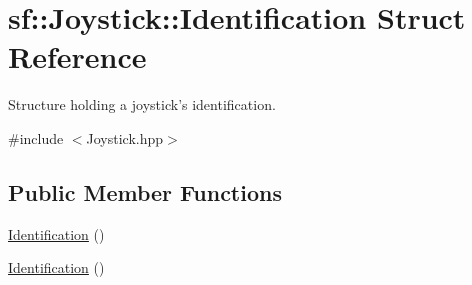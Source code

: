 \hypertarget{structsf_1_1_joystick_1_1_identification}{\section{sf\-:\-:Joystick\-:\-:Identification Struct Reference}
\label{structsf_1_1_joystick_1_1_identification}
}


Structure holding a joystick's identification.  




{\ttfamily \#include $<$Joystick.\-hpp$>$}

\subsection*{Public Member Functions}
\begin{DoxyCompactItemize}
\item 
\hyperlink{structsf_1_1_joystick_1_1_identification_ae36b29759fab7db1d16bb99695093334}{Identification} ()
\item 
\hyperlink{structsf_1_1_joystick_1_1_identification_ae36b29759fab7db1d16bb99695093334}{Identification} ()
\end{DoxyCompactItemize}

